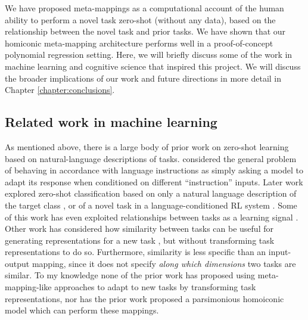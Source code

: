 We have proposed meta-mappings as a computational account of the human ability to perform a novel task zero-shot (without any data), based on the relationship between the novel task and prior tasks. We have shown that our homiconic meta-mapping architecture performs well in a proof-of-concept polynomial regression setting. Here, we will briefly discuss some of the work in machine learning and cognitive science that inspired this project. We will discuss the broader implications of our work and future directions in more detail in Chapter \ref{chapter:conclusions}. 

\subsection{Related work in machine learning}
As mentioned above, there is a large body of prior work on zero-shot learning based on natural-language descriptions of tasks. \citet{Larochelle2008} considered the general problem of behaving in accordance with language instructions as simply asking a model to adapt its response when conditioned on different ``instruction'' inputs. Later work explored zero-shot classification based on only a natural language description of the target class \citep{Socher2013,Romera-Paredes2015,Xian2018}, or of a novel task in a language-conditioned RL system \citep{Hermann2017, Hill2019a}. Some of this work has even exploited relationships between tasks as a learning signal \citep{Oh2017a}. Other work has considered how similarity between tasks can be useful for generating representations for a new task \citep{Pal2019}, but without transforming task representations to do so. Furthermore, similarity is less specific than an input-output mapping, since it does not specify \emph{along which dimensions} two tasks are similar. To my knowledge none of the prior work has proposed using meta-mapping-like approaches to adapt to new tasks by transforming task representations, nor has the prior work proposed a parsimonious homoiconic model which can perform these mappings.

